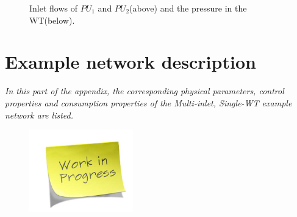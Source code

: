 \vspace{-6.5mm}

 \begin{figure}[H]
 \centering
 \hspace{-3.5mm}
  
 \vspace{-2.5mm}
 \caption{Inlet flows of $PU_1$ and $PU_2$(above) and the pressure in the WT(below).}
 \label{fig:WT_sigma3}
 \end{figure}

 \vspace{-3mm}


\chapter{Example network description}
\label{physical_properties_example1}

\emph{In this part of the appendix, the corresponding physical parameters, control properties and consumption properties of the Multi-inlet, Single-WT example network are listed.}

\begin{figure}[H]
\centering
\includegraphics[width=0.4\textwidth]{report/pictures/missingfigure}
\end{figure}




